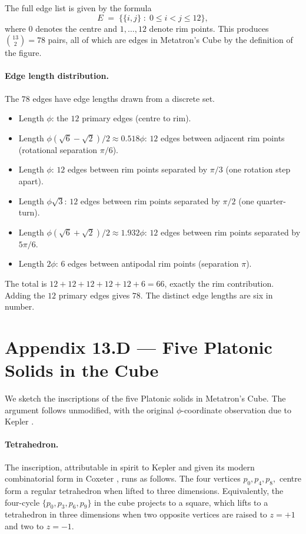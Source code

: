 The full edge list is given by the formula
\[
  E \;=\; \bigl\{ \{i, j\} \;:\; 0 \leq i < j \leq 12 \bigr\},
\]
where $0$ denotes the centre and $1, \ldots, 12$ denote rim points.
This produces $\binom{13}{2} = 78$ pairs, all of which are edges in
Metatron's Cube by the definition of the figure.

\paragraph{Edge length distribution.}
The $78$ edges have edge lengths drawn from a discrete set.
\begin{itemize}
\item Length $\phi$: the $12$ primary edges (centre to rim).
\item Length $\phi(\sqrt{6} - \sqrt{2})/2 \approx 0.518\phi$: $12$
  edges between adjacent rim points (rotational separation
  $\pi/6$).
\item Length $\phi$: $12$ edges between rim points separated by
  $\pi/3$ (one rotation step apart).
\item Length $\phi\sqrt{3}$: $12$ edges between rim points
  separated by $\pi/2$ (one quarter-turn).
\item Length $\phi(\sqrt{6} + \sqrt{2})/2 \approx 1.932\phi$: $12$
  edges between rim points separated by $5\pi/6$.
\item Length $2\phi$: $6$ edges between antipodal rim points
  (separation $\pi$).
\end{itemize}

The total is $12 + 12 + 12 + 12 + 12 + 6 = 66$, exactly the rim
contribution. Adding the $12$ primary edges gives $78$. The
distinct edge lengths are six in number.

\section*{Appendix 13.D --- Five Platonic Solids in the Cube}
\label{fa_13:sec:13-appD}

We sketch the inscriptions of the five Platonic solids in
Metatron's Cube. The argument follows \cite{coxeter1973regular}
unmodified, with the original $\phi$-coordinate observation due to
Kepler \cite{kepler_harmonices}.

\paragraph{Tetrahedron.}
The inscription, attributable in spirit to Kepler
\cite{kepler_harmonices} and given its modern combinatorial form
in Coxeter \cite{coxeter1973regular}, runs as follows. The four
vertices $p_{0}, p_{4}, p_{8}, $ centre form a regular
tetrahedron when lifted to three dimensions. Equivalently, the
four-cycle $\{p_{0}, p_{3}, p_{6}, p_{9}\}$ in the cube projects to
a square, which lifts to a tetrahedron in three dimensions when
two opposite vertices are raised to $z = +1$ and two to $z = -1$.

